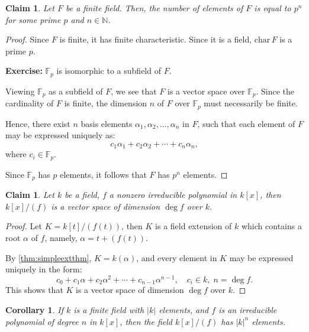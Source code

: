 \documentclass[a4paper,12pt]{report}
\newcommand{\abs}[1]{\left|#1\right|}
\newcounter{statement}
\numberwithin{statement}{chapter}
\newtheorem{claim}[statement]{Claim}
\newtheorem{cor}[statement]{Corollary}
\numberwithin{equation}{chapter}
\numberwithin{section}{chapter}
\numberwithin{subsection}{section}
\begin{document}
\begin{claim}
Let $F$ be a finite field.  Then, the number of elements of $F$ is equal to $p^n$
for some prime $p$ and $n \in \mathbb{N}$.
\end{claim}
\begin{proof}

Since $F$ is finite, it has finite characteristic.  Since it is a field,
$\mathrm{char}\, F$ is a prime $p$.





 {\bf Exercise:}  $\mathbb{F}_p$ is isomorphic to a subfield of $F$.





Viewing $\mathbb{F}_p$ as a subfield of $F$,
we see that $F$ is a vector space over $\mathbb{F}_p$.
Since the cardinality of $F$ is finite, the dimension $n$ of $F$ over $\mathbb{F}_p$
must necessarily be finite.


Hence, there exist $n$ basis elements
$\alpha_1, \alpha_2,\ldots, \alpha_{n }$ in $F$,
such that each element of $F$ may be expressed uniquely as:
\[
c_1\alpha_1  + c_2\alpha_2 + \cdots + c_{n}\alpha_{n},
\]
where $c_i \in \mathbb{F}_p$.


Since $\mathbb{F}_p$ has $p$ elements,
it follows that $F$ has $p^n$ elements.


\end{proof}







\begin{claim}
Let $k$ be a field, $f$ a nonzero irreducible polynomial in $k[x]$,
then $k[x]/(f)$ is a vector space of dimension $\deg f$ over $k$.
\end{claim}
\begin{proof}

Let $K = k[t]/(f(t))$,
then $K$ is a field extension of $k$ which contains a root $\alpha$ of $f$,
namely, $\alpha = t + (f(t))$.


By \cref{thm:simpleextthm},
$K = k(\alpha)$, and every element in $K$ may be expressed uniquely in the form:
\[
c_0 + c_1 \alpha + c_2\alpha^2 + \cdots + c_{n - 1}\alpha^{n - 1},\quad c_i \in k,\; n = \deg f.
\]
This shows that $K$ is a vector space of dimension $\deg f$ over $k$.


\end{proof}



\begin{cor}

If $k$ is a finite field with $\abs{k}$ elements,
and $f$ is an irreducible polynomial of degree $n$ in $k[x]$,
then the field $k[x]/(f)$ has $\abs{k}^n$ elements.

\end{cor}
\end{document}
